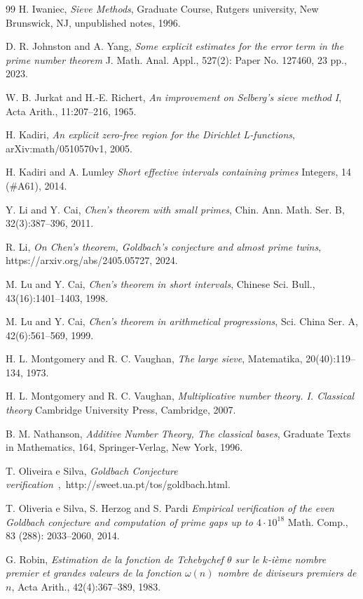 \documentclass[12pt]{amsart}
\begin{document}
\begin{thebibliography}{99}
H. Iwaniec,
\textit{Sieve Methods},
Graduate Course, Rutgers university, New Brunswick, NJ, unpublished notes, 1996.

D. R. Johnston and A. Yang,
\textit{Some explicit estimates for the error term in the prime number theorem}
J. Math. Anal. Appl., 527(2): Paper No. 127460, 23 pp., 2023.

W. B. Jurkat and H.-E. Richert, 
\textit{An improvement on Selberg's sieve method I},
Acta Arith., 11:207--216, 1965.

H. Kadiri, 
\textit{An explicit zero-free region for the Dirichlet L-functions},
arXiv:math/0510570v1, 2005.

H. Kadiri and A. Lumley
\textit{Short effective intervals containing primes}
Integers, 14 (\#A61), 2014.

Y. Li and Y. Cai, 
\textit{Chen's theorem with small primes},
Chin. Ann. Math. Ser. B, 32(3):387--396, 2011. 

R. Li,
\textit{On Chen's theorem, Goldbach's conjecture and almost prime twins},
https://arxiv.org/abs/2405.05727, 2024.


M. Lu and Y. Cai,
\textit{Chen's theorem in short intervals},
Chinese Sci. Bull., 43(16):1401--1403, 1998. 

M. Lu and Y. Cai, 
\textit{Chen's theorem in arithmetical progressions},
Sci. China Ser. A, 42(6):561--569, 1999. 

H. L. Montgomery and R. C. Vaughan, 
\textit{The large sieve},
Matematika, 20(40):119--134, 1973.

H. L. Montgomery and R. C. Vaughan,
\textit{Multiplicative number theory. I. Classical
theory}
Cambridge University Press, Cambridge, 2007.

B. M. Nathanson,
\textit{Additive Number Theory, The classical bases},
 Graduate Texts in Mathematics, 164, Springer-Verlag, New York, 1996.


T. Oliveira e Silva, 
\textit{Goldbach Conjecture verification}~,~http://sweet.ua.pt/tos/goldbach.html. 

T. Oliveria e Silva, S. Herzog and S. Pardi
\textit{Empirical verification of the even Goldbach conjecture and computation of prime gaps up to $4\cdot 10^{18}$}
Math. Comp., 83 (288): 2033--2060, 2014.

G. Robin, 
\textit{Estimation de la fonction de Tchebychef $\theta$ sur le $k$-ième nombre premier et grandes valeurs de la fonction $\omega(n)$ nombre de diviseurs premiers de $n$},
Acta Arith., 42(4):367--389, 1983.


\end{thebibliography}
\end{document}
